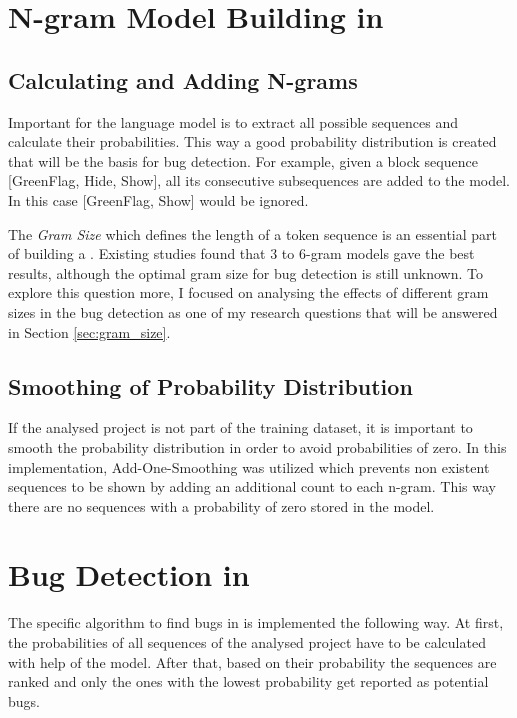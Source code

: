 \section{N-gram Model Building in \scratch{}}\label{sec:model}

\subsection{Calculating and Adding N-grams}\label{subsec:n-grams}
Important for the language model is to extract all possible sequences and calculate their probabilities. This way a good probability distribution is created that will be the basis for bug detection. For example, given a block sequence [GreenFlag, Hide, Show], all its consecutive subsequences are added to the model. In this case [GreenFlag, Show] would be ignored. 

The \textit{Gram Size} which defines the length of a token sequence is an essential part of building a \ngram{}. Existing studies found that 3 to 6-gram models gave the best results, although the optimal gram size for bug detection is still unknown. To explore this question more, I focused on analysing the effects of different gram sizes in the \scratch{} bug detection as one of my research questions that will be answered in Section \ref{sec:gram_size}.

\subsection{Smoothing of Probability Distribution}\label{subsec:smoothing}
If the analysed project is not part of the training dataset, it is important to smooth the probability distribution in order to avoid probabilities of zero. In this implementation, Add-One-Smoothing was utilized which prevents non existent sequences to be shown by adding an additional count to each n-gram. This way there are no sequences with a probability of zero stored in the model. 


\section{Bug Detection in \scratch{}}\label{sec:detection}
The specific algorithm to find bugs in \scratch{} is implemented the following way. At first, the probabilities of all sequences of the analysed project have to be calculated with help of the model. After that, based on their probability the sequences are ranked and only the ones with the lowest probability get reported as potential bugs. 


